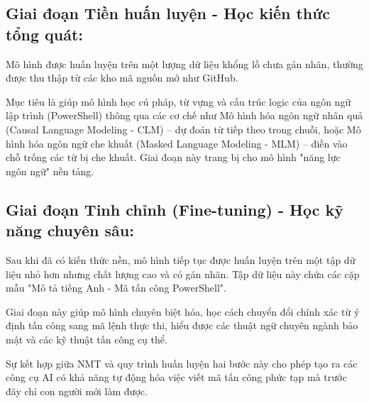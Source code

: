 \subsection{Giai đoạn Tiền huấn luyện - Học kiến thức tổng quát:}
Mô hình được huấn luyện trên một lượng dữ liệu khổng lồ chưa gán nhãn, thường được thu thập từ các kho mã nguồn mở như GitHub. 

Mục tiêu là giúp mô hình học cú pháp, từ vựng và cấu trúc logic của ngôn ngữ lập trình (PowerShell) thông qua các cơ chế như Mô hình hóa ngôn ngữ nhân quả (Causal Language Modeling - CLM) – dự đoán từ tiếp theo trong chuỗi, hoặc Mô hình hóa ngôn ngữ che khuất (Masked Language Modeling - MLM) – điền vào chỗ trống các từ bị che khuất. Giai đoạn này trang bị cho mô hình "năng lực ngôn ngữ" nền tảng. 
\subsection{ Giai đoạn Tinh chỉnh (Fine-tuning) - Học kỹ năng chuyên sâu:}
Sau khi đã có kiến thức nền, mô hình tiếp tục được huấn luyện trên một tập dữ liệu nhỏ hơn nhưng chất lượng cao và có gán nhãn. Tập dữ liệu này chứa các cặp mẫu "Mô tả tiếng Anh - Mã tấn công PowerShell". 

Giai đoạn này giúp mô hình chuyên biệt hóa, học cách chuyển đổi chính xác từ ý định tấn công sang mã lệnh thực thi, hiểu được các thuật ngữ chuyên ngành bảo mật và các kỹ thuật tấn công cụ thể. 

Sự kết hợp giữa NMT và quy trình huấn luyện hai bước này cho phép tạo ra các công cụ AI có khả năng tự động hóa việc viết mã tấn công phức tạp mà trước đây chỉ con người mới làm được. 












